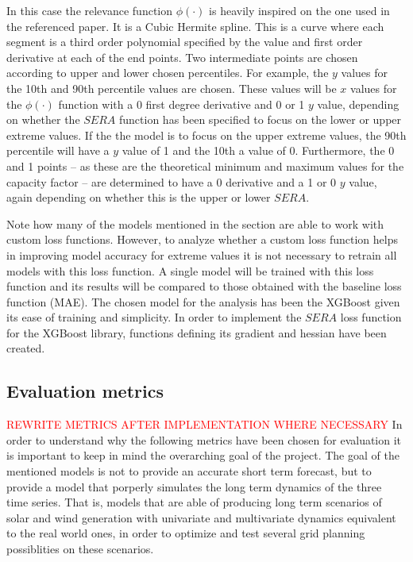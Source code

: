 In this case the relevance function $\phi(\cdot)$ is heavily inspired on the one used in the referenced paper. It is a Cubic Hermite spline. This is a curve where each segment is a third order polynomial specified by the value and first order derivative at each of the end points. Two intermediate points are chosen according to upper and lower chosen percentiles. For example, the $y$ values for the 10th and 90th percentile values are chosen. These values will be $x$ values for the $\phi(\cdot)$ function with a 0 first degree derivative and 0 or 1 $y$ value, depending on whether the $SERA$ function has been specified to focus on the lower or upper extreme values. If the the model is to focus on the upper extreme values, the 90th percentile will have a $y$ value of 1 and the 10th a value of 0. Furthermore, the 0 and 1 points -- as these are the theoretical minimum and maximum values for the capacity factor -- are determined to have a 0 derivative and a 1 or 0 $y$ value, again depending on whether this is the upper or lower $SERA$. 

Note how many of the models mentioned in the  section are able to work with custom loss functions. However, to analyze whether a custom loss function helps in improving model accuracy for extreme values it is not necessary to retrain all models with this loss function. A single model will be trained with this loss function and its results will be compared to those obtained with the baseline loss function (MAE). The chosen model for the analysis has been the XGBoost given its ease of training and simplicity. In order to implement the $SERA$ loss function for the XGBoost library, functions defining its gradient and hessian have been created.
\subsection{Evaluation metrics}
\label{s:evaluation-metrics}
\textcolor{red}{REWRITE METRICS AFTER IMPLEMENTATION WHERE NECESSARY}
In order to understand why the following metrics have been chosen for evaluation it is important to keep in mind the overarching goal of the project. The goal of the mentioned models is not to provide an accurate short term forecast, but to provide a model that porperly simulates the long term dynamics of the three time series. That is, models that are able of producing long term scenarios of solar and wind generation with univariate and multivariate dynamics equivalent to the real world ones, in order to optimize and test several grid planning possiblities on these scenarios. 

